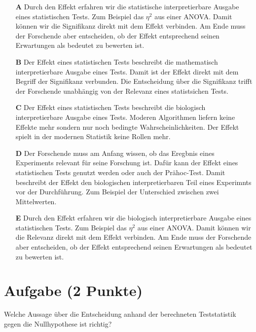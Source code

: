 \documentclass[a4paper, 9pt]{scrartcl}\usepackage[]{graphicx}\usepackage[]{xcolor}
\begin{document}
\begin{enumerate}
\item [\textbf{A} \msquare] Durch den Effekt erfahren wir die statistische interpretierbare Ausgabe eines statistischen Tests. Zum Beispiel das $\eta^2$ aus einer ANOVA. Damit können wir die Signifikanz direkt mit dem Effekt verbinden. Am Ende muss der Forschende aber entscheiden, ob der Effekt entsprechend seinen Erwartungen als bedeutet zu bewerten ist.
\item [\textbf{B} \msquare] Der Effekt eines statistischen Tests beschreibt die mathematisch interpretierbare Ausgabe eines Tests. Damit ist der Effekt direkt mit dem Begriff der Signifikanz verbunden. Die Entscheidung über die Signifikanz trifft der Forschende unabhängig von der Relevanz eines statistsichen Tests.
\item [\textbf{C} \msquare] Der Effekt eines statistischen Tests beschreibt die biologisch interpretierbare Ausgabe eines Tests. Moderen Algorithmen liefern keine Effekte mehr sondern nur noch bedingte Wahrscheinlichkeiten. Der Effekt spielt in der modernen Statistik keine Rollen mehr.
\item [\textbf{D} \msquare] Der Forschende muss am Anfang wissen, ob das Eregbnis eines Experiments relevant für seine Forschung ist. Dafür kann der Effekt eines statistischen Tests genutzt werden oder auch der Prähoc-Test. Damit beschreibt der Effekt den biologischen interpretierbaren Teil eines Experimnts vor der Durchführung. Zum Beispiel der Unterschied zwischen zwei Mittelwerten.
\item [\textbf{E} \msquare] Durch den Effekt erfahren wir die biologisch interpretierbare Ausgabe eines statistischen Tests. Zum Beispiel das $\eta^2$ aus einer ANOVA. Damit können wir die Relevanz direkt mit dem Effekt verbinden. Am Ende muss der Forschende aber entscheiden, ob der Effekt entsprechend seinen Erwartungen als bedeutet zu bewerten ist.
\end{enumerate}

\section{Aufgabe \hfill (2 Punkte)}



Welche Aussage über die Entscheidung anhand der berechneten Teststatistik gegen die
Nullhypothese ist richtig?
\end{document}
